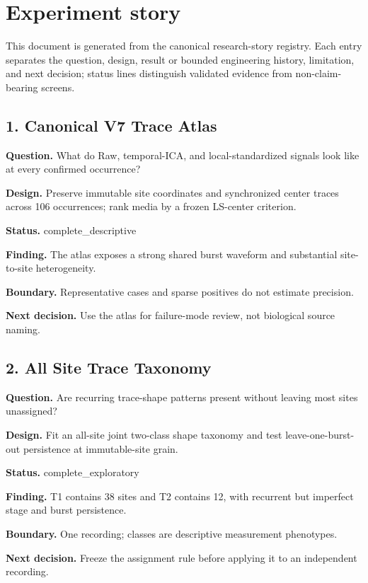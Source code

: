 \section{Experiment story}

This document is generated from the canonical research-story registry. Each entry separates the question, design, result or bounded engineering history, limitation, and next decision; status lines distinguish validated evidence from non-claim-bearing screens.

\subsection{1. Canonical V7 Trace Atlas}

\textbf{Question.} What do Raw, temporal-ICA, and local-standardized signals look like at every confirmed occurrence?

\textbf{Design.} Preserve immutable site coordinates and synchronized center traces across 106 occurrences; rank media by a frozen LS-center criterion.

\textbf{Status.} complete\_descriptive

\textbf{Finding.} The atlas exposes a strong shared burst waveform and substantial site-to-site heterogeneity.

\textbf{Boundary.} Representative cases and sparse positives do not estimate precision.

\textbf{Next decision.} Use the atlas for failure-mode review, not biological source naming.

\subsection{2. All Site Trace Taxonomy}

\textbf{Question.} Are recurring trace-shape patterns present without leaving most sites unassigned?

\textbf{Design.} Fit an all-site joint two-class shape taxonomy and test leave-one-burst-out persistence at immutable-site grain.

\textbf{Status.} complete\_exploratory

\textbf{Finding.} T1 contains 38 sites and T2 contains 12, with recurrent but imperfect stage and burst persistence.

\textbf{Boundary.} One recording; classes are descriptive measurement phenotypes.

\textbf{Next decision.} Freeze the assignment rule before applying it to an independent recording.

